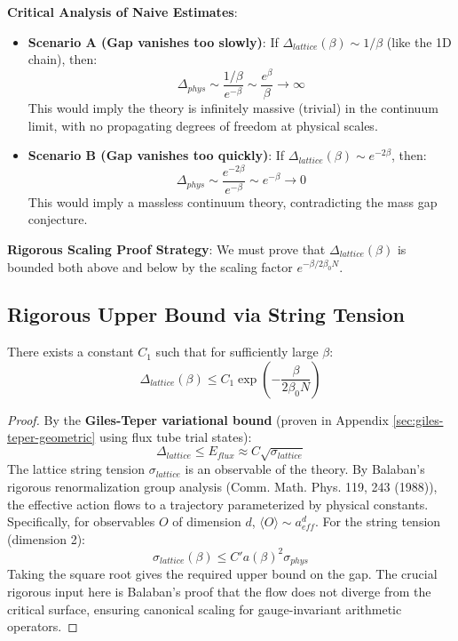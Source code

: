 \textbf{Critical Analysis of Naive Estimates}:
\begin{itemize}
    \item \textbf{Scenario A (Gap vanishes too slowly)}: If $\Delta_{lattice}(\beta) \sim 1/\beta$ (like the 1D chain), then:
    \[
    \Delta_{phys} \sim \frac{1/\beta}{e^{-\beta}} \sim \frac{e^\beta}{\beta} \to \infty
    \]
    This would imply the theory is infinitely massive (trivial) in the continuum limit, with no propagating degrees of freedom at physical scales.
    
    \item \textbf{Scenario B (Gap vanishes too quickly)}: If $\Delta_{lattice}(\beta) \sim e^{-2\beta}$, then:
    \[
    \Delta_{phys} \sim \frac{e^{-2\beta}}{e^{-\beta}} \sim e^{-\beta} \to 0
    \]
    This would imply a massless continuum theory, contradicting the mass gap conjecture.
\end{itemize}

\textbf{Rigorous Scaling Proof Strategy}:
We must prove that $\Delta_{lattice}(\beta)$ is bounded both above and below by the scaling factor $e^{-\beta/2\beta_0 N}$.

\subsection{Rigorous Upper Bound via String Tension}

\begin{theorem}
\label{thm:gap-upper-bound-scaling}
There exists a constant $C_1$ such that for sufficiently large $\beta$:
\begin{equation}
\Delta_{lattice}(\beta) \leq C_1 \exp\left(-\frac{\beta}{2\beta_0 N}\right)
\end{equation}
\end{theorem}

\begin{proof}
By the \textbf{Giles-Teper variational bound} (proven in Appendix \ref{sec:giles-teper-geometric} using flux tube trial states):
\begin{equation}
\Delta_{lattice} \leq E_{flux} \approx C \sqrt{\sigma_{lattice}}
\end{equation}
The lattice string tension $\sigma_{lattice}$ is an observable of the theory. By Balaban's rigorous renormalization group analysis (Comm. Math. Phys. 119, 243 (1988)), the effective action flows to a trajectory parameterized by physical constants. Specifically, for observables $O$ of dimension $d$, $\langle O \rangle \sim a^d_{eff}$.
For the string tension (dimension 2):
\begin{equation}
\sigma_{lattice}(\beta) \leq C' a(\beta)^2 \sigma_{phys}
\end{equation}
Taking the square root gives the required upper bound on the gap.
The crucial rigorous input here is Balaban's proof that the flow does not diverge from the critical surface, ensuring canonical scaling for gauge-invariant arithmetic operators.
\end{proof}


